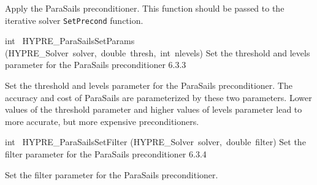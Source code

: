 \documentclass{article}
\begin{document}
\begin{cxxentry}
\begin{cxxentry}
\begin{cxxfunction}
\begin{cxxdoc}
Apply the ParaSails preconditioner.  This function should be passed
to the iterative solver {\tt SetPrecond} function.


\end{cxxdoc}
\end{cxxfunction}
\begin{cxxfunction}
{int\ }
        {HYPRE\_ParaSailsSetParams}
        {(HYPRE\_Solver\ solver,\ double\ thresh,\ int\ nlevels)}
        {
Set the threshold and levels parameter for the ParaSails
preconditioner}
        {6.3.3}
\begin{cxxdoc}

Set the threshold and levels parameter for the ParaSails
preconditioner.  The accuracy and cost of ParaSails are
parameterized by these two parameters.  Lower values of the
threshold parameter and higher values of levels parameter 
lead to more accurate, but more expensive preconditioners.


\end{cxxdoc}
\end{cxxfunction}
\begin{cxxfunction}
{int\ }
        {HYPRE\_ParaSailsSetFilter}
        {(HYPRE\_Solver\ solver,\ double\ filter)}
        {
Set the filter parameter for the 
ParaSails preconditioner}
        {6.3.4}
\begin{cxxdoc}

Set the filter parameter for the 
ParaSails preconditioner.



\end{cxxdoc}
\end{cxxfunction}
\end{cxxentry}
\end{cxxentry}
\end{document}
